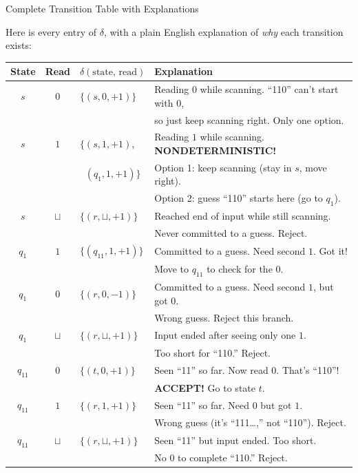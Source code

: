 \begin{examplebox}{Complete Transition Table with Explanations}

Here is every entry of $\delta$, with a plain English explanation of \emph{why}
each transition exists:

\begin{center}
\renewcommand{\arraystretch}{1.5}
\begin{tabular}{ccll}
\toprule
\textbf{State} & \textbf{Read} & \textbf{$\delta(\text{state, read})$} &
\textbf{Explanation} \\
\midrule
$s$ & $0$ & $\{(s, 0, +1)\}$ &
  Reading $0$ while scanning. ``110'' can't start with $0$, \\
& & & so just keep scanning right. Only one option. \\
\midrule
$s$ & $1$ & $\{(s, 1, +1),$ &
  Reading $1$ while scanning. \textbf{NONDETERMINISTIC!} \\
& & $\;\;(q_1, 1, +1)\}$ &
  Option 1: keep scanning (stay in $s$, move right). \\
& & &
  Option 2: guess ``110'' starts here (go to $q_1$). \\
\midrule
$s$ & $\sqcup$ & $\{(r, \sqcup, +1)\}$ &
  Reached end of input while still scanning. \\
& & & Never committed to a guess. Reject. \\
\midrule
$q_1$ & $1$ & $\{(q_{11}, 1, +1)\}$ &
  Committed to a guess. Need second $1$. Got it! \\
& & & Move to $q_{11}$ to check for the $0$. \\
\midrule
$q_1$ & $0$ & $\{(r, 0, -1)\}$ &
  Committed to a guess. Need second $1$, but got $0$. \\
& & & Wrong guess. Reject this branch. \\
\midrule
$q_1$ & $\sqcup$ & $\{(r, \sqcup, +1)\}$ &
  Input ended after seeing only one $1$. \\
& & & Too short for ``110.'' Reject. \\
\midrule
$q_{11}$ & $0$ & $\{(t, 0, +1)\}$ &
  Seen ``11'' so far. Now read $0$. That's ``110''! \\
& & & \textbf{ACCEPT!} Go to state $t$. \\
\midrule
$q_{11}$ & $1$ & $\{(r, 1, +1)\}$ &
  Seen ``11'' so far. Need $0$ but got $1$. \\
& & & Wrong guess (it's ``111\ldots,'' not ``110''). Reject. \\
\midrule
$q_{11}$ & $\sqcup$ & $\{(r, \sqcup, +1)\}$ &
  Seen ``11'' but input ended. Too short. \\
& & & No $0$ to complete ``110.'' Reject. \\
\bottomrule
\end{tabular}
\end{center}


\end{examplebox}
